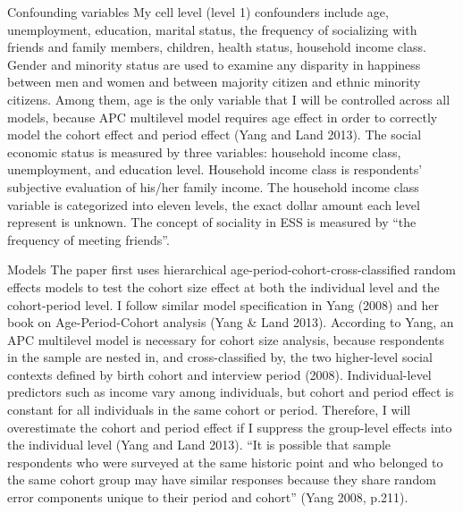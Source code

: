 Confounding variables
My cell level (level 1) confounders include age, unemployment, education, marital status, the frequency of socializing with friends and family members, children, health status, household income class. Gender and minority status are used to examine any disparity in happiness between men and women and between majority citizen and ethnic minority citizens. Among them, age is the only variable that I will be controlled across all models, because APC multilevel model requires age effect in order to correctly model the cohort effect and period effect (Yang and Land 2013). The social economic status is measured by three variables: household income class, unemployment, and education level. Household income class is respondents’ subjective evaluation of his/her family income. The household income class variable is categorized into eleven levels, the exact dollar amount each level represent is unknown.  The concept of sociality in ESS is measured by “the frequency of meeting friends”.

Models
The paper first uses hierarchical age-period-cohort-cross-classified random effects models to test the cohort size effect at both the individual level and the cohort-period level. I follow similar model specification in Yang (2008) and her book on Age-Period-Cohort analysis (Yang & Land 2013).  According to Yang, an APC multilevel model is necessary for cohort size analysis, because respondents in the sample are nested in, and cross-classified by, the two higher-level social contexts defined by birth cohort and interview period (2008). Individual-level predictors such as income vary among individuals, but cohort and period effect is constant for all individuals in the same cohort or period. Therefore, I will overestimate the cohort and period effect if I suppress the group-level effects into the individual level (Yang and Land 2013). “It is possible that sample respondents who were surveyed at the same historic point and who belonged to the same cohort group may have similar responses because they share random error components unique to their period and cohort” (Yang 2008, p.211).

